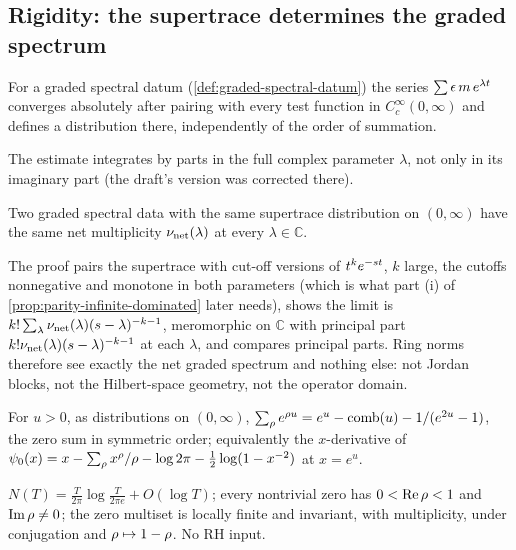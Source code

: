 \subsection{Rigidity: the supertrace determines the graded spectrum}

\begin{lemma}
\label{lem:supertrace-distribution}
For a graded spectral datum (\cref{def:graded-spectral-datum}) the series
$\sum\epsilon\,m\,e^{\lambda t}$ converges absolutely after pairing with every test
function in $C_c^\infty(0,\infty)$ and defines a distribution there, independently of the
order of summation.
\end{lemma}

The estimate integrates by parts in the full complex parameter $\lambda$, not only in its
imaginary part (the draft's version was corrected there).

\begin{theorem}
\label{thm:supertrace-rigidity}
Two graded spectral data with the same supertrace distribution on $(0,\infty)$ have the
same net multiplicity $\nu_{\mathrm{net}}(\lambda)$ at every $\lambda\in\mathbb C$.
\end{theorem}

The proof pairs the supertrace with cut-off versions of $t^ke^{-st}$, $k$ large, the
cutoffs nonnegative and monotone in both parameters (which is what part (i) of
\cref{prop:parity-infinite-dominated} later needs),
shows the limit is $k!\sum_\lambda\nu_{\mathrm{net}}(\lambda)(s-\lambda)^{-k-1}$, meromorphic on
$\mathbb C$ with principal part $k!\nu_{\mathrm{net}}(\lambda)(s-\lambda)^{-k-1}$ at each $\lambda$,
and compares principal parts. Ring norms therefore see exactly the net graded spectrum and
nothing else: not Jordan blocks, not the Hilbert-space geometry, not the operator domain.

\begin{assumption}
\label{asm:explicit-formula-trace}
For $u>0$, as distributions on $(0,\infty)$, $\sum_\rho e^{\rho u} = e^u - \operatorname{comb}(u) -
1/(e^{2u}-1)$, the zero sum in symmetric order; equivalently the $x$-derivative of
$\psi_0(x) = x - \sum_\rho x^\rho/\rho - \log2\pi - \tfrac12\log(1-x^{-2})$ at $x = e^u$.
\end{assumption}

\begin{assumption}
\label{asm:zero-count-location}
$N(T) = \frac{T}{2\pi}\log\frac{T}{2\pi e} + O(\log T)$; every nontrivial zero has
$0<\operatorname{Re}\rho<1$ and $\operatorname{Im}\rho\ne0$; the zero multiset is locally finite and invariant, with
multiplicity, under conjugation and $\rho\mapsto1-\rho$. No RH input.
\end{assumption}

